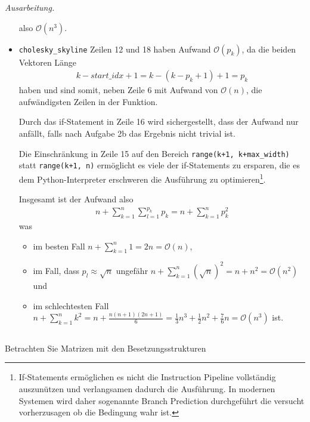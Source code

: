 \documentclass[titlepage]{article}
\newenvironment{ausarbeitung}{\vspace{3mm}\noindent\textit{Ausarbeitung.}}{}
\begin{document}
\begin{ausarbeitung}
\begin{itemize}
		also $\mathcal{O}(n^3)$.
		
		\item \texttt{cholesky\_skyline} Zeilen 12 und 18 haben Aufwand $\mathcal{O}(p_k)$, da die beiden Vektoren Länge
		\begin{align*}
			k - start\_idx + 1 = k - (k - p_k + 1) + 1 = p_k
		\end{align*}
		haben und sind somit, neben Zeile 6 mit Aufwand von $\mathcal{O}(n)$, die aufwändigsten Zeilen in der Funktion.
		
		Durch das if-Statement in Zeile 16 wird sichergestellt, dass der Aufwand nur anfällt, falls nach Aufgabe 2b das Ergebnis nicht trivial ist.
		
		Die Einschränkung in Zeile 15 auf den Bereich \texttt{range(k+1, k+max\_width)} statt \texttt{range(k+1, n)} ermöglicht es viele der if-Statements zu ersparen, die es dem Python-Interpreter erschweren die Ausführung zu optimieren\footnote{If-Statements ermöglichen es nicht die Instruction Pipeline vollständig auszunützen und verlangsamen dadurch die Ausführung. In modernen Systemen wird daher sogenannte Branch Prediction durchgeführt die versucht vorherzusagen ob die Bedingung wahr ist.}.
		
		Insgesamt ist der Aufwand also
		\begin{align*}
			n + \sum_{k=1}^{n} \sum_{l=1}^{p_k}p_k = n + \sum_{k=1}^{n} p_k^2
		\end{align*}
		was
		\begin{itemize}
			\item im besten Fall $n + \sum_{k=1}^{n} 1 = 2n = \mathcal{O}(n)$,
			\item im Fall, dass $p_l \approx \sqrt{n}$ ungefähr $n + \sum_{k=1}^{n}(\sqrt{n})^2 = n + n^2 = \mathcal{O}(n^2)$ und
			\item im schlechtesten Fall $n + \sum_{k=1}^{n}k^2 = n + \frac{n(n+1)(2n+1)}{6} = \frac{1}{3}n^3 + \frac{1}{2}n^2 + \frac{7}{6}n = \mathcal{O}(n^3)$ ist.
		\end{itemize}
	\end{itemize}
	
\end{ausarbeitung}


\subsection{}
Betrachten Sie Matrizen mit den Besetzungsstrukturen
\end{document}
